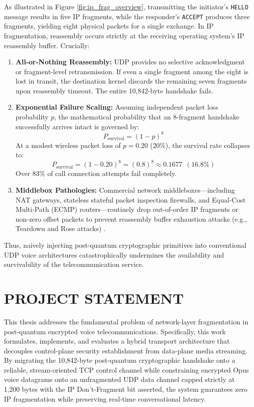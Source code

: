 As illustrated in Figure \ref{fig:ip_frag_overview}, transmitting the initiator's \texttt{HELLO} message results in five IP fragments, while the responder's \texttt{ACCEPT} produces three fragments, yielding eight physical packets for a single exchange. In IP fragmentation, reassembly occurs strictly at the receiving operating system's IP reassembly buffer. Crucially:
\begin{enumerate}
    \item \textbf{All-or-Nothing Reassembly:} UDP provides no selective acknowledgment or fragment-level retransmission. If even a single fragment among the eight is lost in transit, the destination kernel discards the remaining seven fragments upon reassembly timeout. The entire 10,842-byte handshake fails.
    \item \textbf{Exponential Failure Scaling:} Assuming independent packet loss probability $p$, the mathematical probability that an 8-fragment handshake successfully arrives intact is governed by:
    \begin{equation}
        P_{\text{survival}} = (1 - p)^8
    \end{equation}
    At a modest wireless packet loss of $p = 0.20$ (20\%), the survival rate collapses to:
    \begin{equation}
        P_{\text{survival}} = (1 - 0.20)^8 = (0.8)^8 \approx 0.1677\ \ (16.8\%)
    \end{equation}
    Over 83\% of call connection attempts fail completely.
    \item \textbf{Middlebox Pathologies:} Commercial network middleboxes—including NAT gateways, stateless stateful packet inspection firewalls, and Equal-Cost Multi-Path (ECMP) routers—routinely drop out-of-order IP fragments or non-zero offset packets to prevent reassembly buffer exhaustion attacks (e.g., Teardown and Rose attacks) \cite{shannon1984ipfrag}.
\end{enumerate}

Thus, naively injecting post-quantum cryptographic primitives into conventional UDP voice architectures catastrophically undermines the availability and survivability of the telecommunication service.

\section{PROJECT STATEMENT}
This thesis addresses the fundamental problem of network-layer fragmentation in post-quantum encrypted voice telecommunications. Specifically, this work formulates, implements, and evaluates a hybrid transport architecture that decouples control-plane security establishment from data-plane media streaming. By migrating the 10,842-byte post-quantum cryptographic handshake onto a reliable, stream-oriented TCP control channel while constraining encrypted Opus voice datagrams onto an unfragmented UDP data channel capped strictly at 1,200 bytes with the IP Don't-Fragment bit asserted, the system guarantees zero IP fragmentation while preserving real-time conversational latency.

